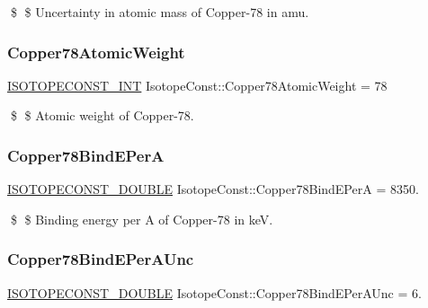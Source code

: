 \$ \$ Uncertainty in atomic mass of Copper-\/78 in amu. \mbox{\label{group___isotope_const-_copper-_cu78_ga001ae94b460db5aa97dab62576d5f672}} 
\subsubsection{\texorpdfstring{Copper78\+Atomic\+Weight}{Copper78AtomicWeight}}
{\footnotesize\ttfamily \mbox{\hyperlink{group___isotope_const-_macros_ga5f18360b3e99483a35c32d789e62621c}{I\+S\+O\+T\+O\+P\+E\+C\+O\+N\+S\+T\+\_\+\+I\+NT}} Isotope\+Const\+::\+Copper78\+Atomic\+Weight = 78}

\$ \$ Atomic weight of Copper-\/78. \mbox{\label{group___isotope_const-_copper-_cu78_ga777ca1075c5105912891e58417e8c032}} 
\subsubsection{\texorpdfstring{Copper78\+Bind\+E\+PerA}{Copper78BindEPerA}}
{\footnotesize\ttfamily \mbox{\hyperlink{group___isotope_const-_macros_ga8f45a7272ce02c0b4c65c44636ed719a}{I\+S\+O\+T\+O\+P\+E\+C\+O\+N\+S\+T\+\_\+\+D\+O\+U\+B\+LE}} Isotope\+Const\+::\+Copper78\+Bind\+E\+PerA = 8350.}

\$ \$ Binding energy per A of Copper-\/78 in keV. \mbox{\label{group___isotope_const-_copper-_cu78_gadf92d2f6dccc839beed9c380e3d58b54}} 
\subsubsection{\texorpdfstring{Copper78\+Bind\+E\+Per\+A\+Unc}{Copper78BindEPerAUnc}}
{\footnotesize\ttfamily \mbox{\hyperlink{group___isotope_const-_macros_ga8f45a7272ce02c0b4c65c44636ed719a}{I\+S\+O\+T\+O\+P\+E\+C\+O\+N\+S\+T\+\_\+\+D\+O\+U\+B\+LE}} Isotope\+Const\+::\+Copper78\+Bind\+E\+Per\+A\+Unc = 6.}

